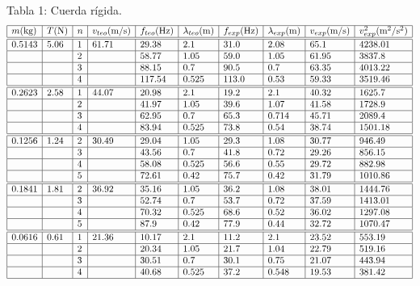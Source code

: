 \documentclass{article}
\begin{document}
\begin{center}
  Tabla 1: Cuerda rígida.
  $$
  \begin{array}{|l|l|l|l|l|l|l|l|l|l|} \hline
    m\text{(kg)} & T\text{(N)} & n & v_{teo}\text{(m/s)} & f_{teo}\text{(Hz)} & \lambda_{teo}\text{(m)} & f_{exp}\text{(Hz)} & \lambda_{exp}\text{(m)} & v_{exp}\text{(m/s)} & v_{exp}^2\text{(m\textsuperscript{2}/s\textsuperscript{2})} \\ \hline \hline
    0.5143 & 5.06 & 1 & 61.71 & 29.38 & 2.1 & 31.0 & 2.08 & 65.1 & 4238.01  \\ \hline
     &  & 2 &  & 58.77 & 1.05 & 59.0 & 1.05 & 61.95 & 3837.8  \\ \hline
     &  & 3 &  & 88.15 & 0.7 & 90.5 & 0.7 & 63.35 & 4013.22  \\ \hline
     &  & 4 &  & 117.54 & 0.525 & 113.0 & 0.53 & 59.33 & 3519.46  \\ \hline \hline
    0.2623 & 2.58 & 1 & 44.07 & 20.98 & 2.1 & 19.2 & 2.1 & 40.32 & 1625.7  \\ \hline
     &  & 2 &  & 41.97 & 1.05 & 39.6 & 1.07 & 41.58 & 1728.9  \\ \hline
     &  & 3 &  & 62.95 & 0.7 & 65.3 & 0.714 & 45.71 & 2089.4  \\ \hline
     &  & 4 &  & 83.94 & 0.525 & 73.8 & 0.54 & 38.74 & 1501.18  \\ \hline \hline
    0.1256 & 1.24 & 2 & 30.49 & 29.04 & 1.05 & 29.3 & 1.08 & 30.77 & 946.49  \\ \hline
     &  & 3 &  & 43.56 & 0.7 & 41.8 & 0.72 & 29.26 & 856.15  \\ \hline
     &  & 4 &  & 58.08 & 0.525 & 56.6 & 0.55 & 29.72 & 882.98  \\ \hline
     &  & 5 &  & 72.61 & 0.42 & 75.7 & 0.42 & 31.79 & 1010.86  \\ \hline \hline
    0.1841 & 1.81 & 2 & 36.92 & 35.16 & 1.05 & 36.2 & 1.08 & 38.01 & 1444.76  \\ \hline
     &  & 3 &  & 52.74 & 0.7 & 53.7 & 0.72 & 37.59 & 1413.01  \\ \hline
     &  & 4 &  & 70.32 & 0.525 & 68.6 & 0.52 & 36.02 & 1297.08  \\ \hline
     &  & 5 &  & 87.9 & 0.42 & 77.9 & 0.44 & 32.72 & 1070.47  \\ \hline \hline
    0.0616 & 0.61 & 1 & 21.36 & 10.17 & 2.1 & 11.2 & 2.1 & 23.52 & 553.19  \\ \hline
     &  & 2 &  & 20.34 & 1.05 & 21.7 & 1.04 & 22.79 & 519.16  \\ \hline
     &  & 3 &  & 30.51 & 0.7 & 30.1 & 0.75 & 21.07 & 443.94  \\ \hline
     &  & 4 &  & 40.68 & 0.525 & 37.2 & 0.548 & 19.53 & 381.42  \\ \hline
    \end{array}
  $$
\end{center}
\end{document}
